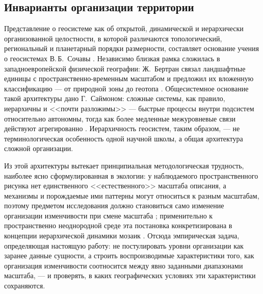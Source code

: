 \documentclass[11pt,a4paper]{article}
\begin{document}
\subsection{Инварианты организации территории}

Представление о геосистеме как об открытой, динамической и иерархически организованной целостности, в которой различаются топологический, региональный и планетарный порядки размерности, составляет основание учения о геосистемах В.\,Б.~Сочавы \cite{Sochava1978}. Независимо близкая рамка сложилась в западноевропейской физической географии: Ж.~Бертран связал ландшафтные единицы с пространственно-временным масштабом и предложил их вложенную классификацию --- от природной зоны до геотопа \cite{Bertrand1968}. Общесистемное основание такой архитектуры дано Г.~Саймоном: сложные системы, как правило, иерархичны и <<почти разложимы>> --- быстрые процессы внутри подсистем относительно автономны, тогда как более медленные межуровневые связи действуют агрегированно \cite{Simon1962}. Иерархичность геосистем, таким образом, --- не терминологическая особенность одной научной школы, а общая архитектура сложной организации.

Из этой архитектуры вытекает принципиальная методологическая трудность, наиболее ясно сформулированная в экологии: у наблюдаемого пространственного рисунка нет единственного <<естественного>> масштаба описания, а механизмы и порождаемые ими паттерны могут относиться к разным масштабам, поэтому предметом исследования должно становиться само изменение организации изменчивости при смене масштаба \cite{Levin1992}; применительно к пространственно неоднородной среде эта постановка конкретизирована в концепции иерархической динамики мозаик \cite{WuLoucks1995}. Отсюда эмпирическая задача, определяющая настоящую работу: не постулировать уровни организации как заранее данные сущности, а строить воспроизводимые характеристики того, как организация изменчивости соотносится между явно заданными диапазонами масштаба, --- и проверять, в каких географических условиях эти характеристики сохраняются.
\end{document}
